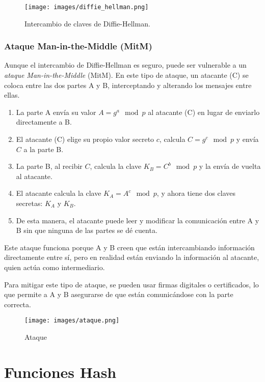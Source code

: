 \documentclass[a4paper,12pt]{article}
\begin{document}
\begin{figure}[H]
    \centering
    \texttt{[image: images/diffie\_hellman.png]}
    \caption{Intercambio de claves de Diffie-Hellman.}
\end{figure}


\subsubsection{Ataque Man-in-the-Middle (MitM)}

Aunque el intercambio de Diffie-Hellman es seguro, puede ser vulnerable a un \textit{ataque Man-in-the-Middle} (MitM). En este tipo de ataque, un atacante (C) se coloca entre las dos partes A y B, interceptando y alterando los mensajes entre ellas.

\begin{enumerate}
    \item La parte A envía su valor \( A = g^a \mod p \) al atacante (C) en lugar de enviarlo directamente a B.
    \item El atacante (C) elige su propio valor secreto \( c \), calcula \( C = g^c \mod p \) y envía \( C \) a la parte B.
    \item La parte B, al recibir \( C \), calcula la clave \( K_B = C^b \mod p \) y la envía de vuelta al atacante.
    \item El atacante calcula la clave \( K_A = A^c \mod p \), y ahora tiene dos claves secretas: \( K_A \) y \( K_B \).
    \item De esta manera, el atacante puede leer y modificar la comunicación entre A y B sin que ninguna de las partes se dé cuenta.
\end{enumerate}

Este ataque funciona porque A y B creen que están intercambiando información directamente entre sí, pero en realidad están enviando la información al atacante, quien actúa como intermediario.

Para mitigar este tipo de ataque, se pueden usar firmas digitales o certificados, lo que permite a A y B asegurarse de que están comunicándose con la parte correcta.

\begin{figure}[H]
    \centering
    \texttt{[image: images/ataque.png]}
    \caption{Ataque}
\end{figure}

\section{Funciones Hash}
\end{document}
